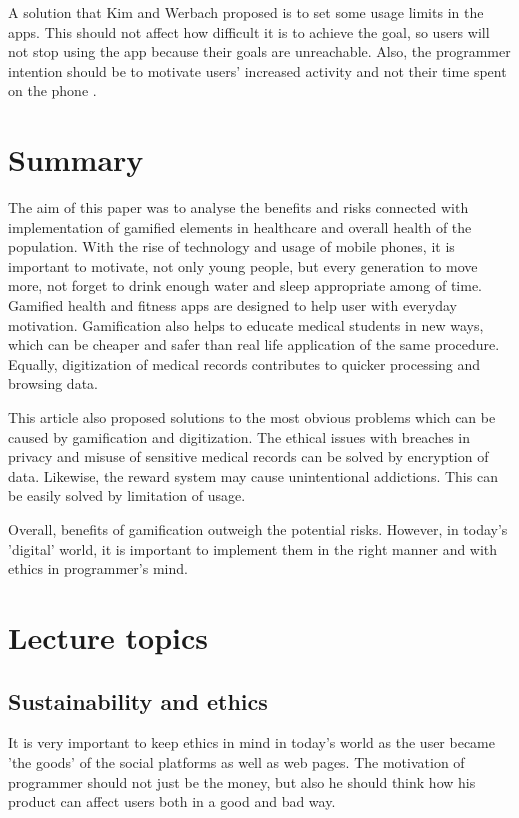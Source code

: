 \documentclass[10pt,twoside,english,a4paper]{article}
\begin{document}
A solution that Kim and Werbach proposed is to set some usage limits in the apps. This should not affect how difficult it is to achieve the goal, so users will not stop using the app because their goals are unreachable. Also, the programmer intention should be to motivate users' increased activity and not their time spent on the phone \cite{Kim2016}. 

%
%
%


\section{Summary} \label{summary} 
The aim of this paper was to analyse the benefits and risks connected with implementation of gamified elements in healthcare and overall health of the population. With the rise of technology and usage of mobile phones, it is important to motivate, not only young people, but every generation to move more, not forget to drink enough water and sleep appropriate among of time. Gamified health and fitness apps are designed to help user with everyday motivation. Gamification also helps to educate medical students in new ways, which can be cheaper and safer than real life application of the same procedure. Equally, digitization of medical records contributes to quicker processing and browsing data.

This article also proposed solutions to the most obvious problems which can be caused by gamification and digitization. The ethical issues with breaches in privacy and misuse of sensitive medical records can be solved by encryption of data. Likewise, the reward system may cause unintentional addictions. This can be easily solved by limitation of usage.

Overall, benefits of gamification outweigh the potential risks. However, in today's 'digital' world, it is important to implement them in the right manner and with ethics in programmer's mind. 

%
%
%

\section{Lecture topics}\label{prednasky}
\subsection{Sustainability and ethics}
It is very important to keep ethics in mind in today's world as the user became 'the goods' of the social platforms as well as web pages. The motivation of programmer should not just be the money, but also he should think how his product can affect users both in a good and bad way.
\end{document}
